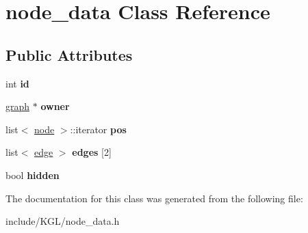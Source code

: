 \hypertarget{classnode__data}{}\section{node\+\_\+data Class Reference}
\label{classnode__data}
\subsection*{Public Attributes}
\begin{DoxyCompactItemize}
\item 
\mbox{\label{classnode__data_ac87541ac4470e3c17df808ec9a67f6c4}} 
int {\bfseries id}
\item 
\mbox{\label{classnode__data_a20acb07c56fa28df6cbdbf3b0a02cb66}} 
\mbox{\hyperlink{classgraph}{graph}} $\ast$ {\bfseries owner}
\item 
\mbox{\label{classnode__data_a0a1d005ddbb3a1b7a76423297a2cfc85}} 
list$<$ \mbox{\hyperlink{classnode}{node}} $>$\+::iterator {\bfseries pos}
\item 
\mbox{\label{classnode__data_a91e70d0b1b62c95eca22eb80134b1fa5}} 
list$<$ \mbox{\hyperlink{classedge}{edge}} $>$ {\bfseries edges} \mbox{[}2\mbox{]}
\item 
\mbox{\label{classnode__data_a0a841a84f5038562908d726392ce1b55}} 
bool {\bfseries hidden}
\end{DoxyCompactItemize}


The documentation for this class was generated from the following file\+:\begin{DoxyCompactItemize}
\item 
include/\+K\+G\+L/node\+\_\+data.\+h\end{DoxyCompactItemize}
